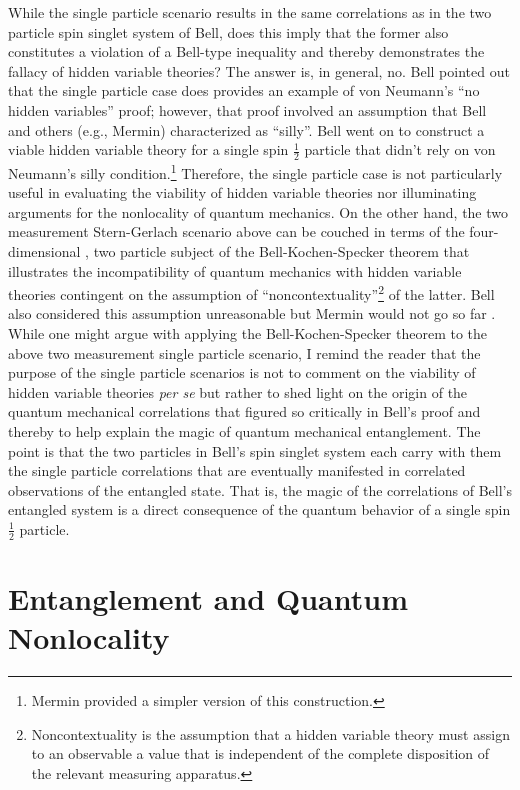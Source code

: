 \documentclass[12pt]{article}
\begin{document}
While the single particle scenario results in the same correlations as in the two particle spin singlet system of Bell, does this imply that the former also constitutes a violation of a Bell-type inequality and thereby demonstrates the fallacy of hidden variable theories?  The answer is, in general, no.  Bell \cite{Bel66} pointed out that the single particle case does provides an example of von Neumann's ``no hidden variables'' proof; however, that proof involved an assumption that Bell and others (e.g., Mermin\cite{Mer93}) characterized as ``silly''.  Bell went on to construct a viable hidden variable theory for a single spin $\frac{1}{2}$ particle that didn't rely on von Neumann's silly condition.\footnote{ Mermin \cite{Mer93} provided a simpler version of this construction.}  Therefore, the single particle case is not particularly useful in evaluating the viability of hidden variable theories nor illuminating arguments for the nonlocality of quantum mechanics.  On the other hand, the two measurement Stern-Gerlach scenario above can be couched in terms of the four-dimensional , two particle subject of the Bell-Kochen-Specker theorem\cite{Mer93} that illustrates the incompatibility of quantum mechanics with hidden variable theories contingent on the assumption of ``noncontextuality''\footnote{Noncontextuality is the assumption that a hidden variable theory must assign to an observable a value that is independent of the complete disposition of the relevant measuring apparatus.} of the latter.  Bell\cite{Bel66} also considered this assumption unreasonable but Mermin would not go so far \cite{Mer93}.  While one might argue with applying the Bell-Kochen-Specker theorem to the above two measurement single particle scenario, I remind the reader that the purpose of the single particle scenarios is not to comment on the viability of hidden variable theories {\it per se} but rather to shed light on the origin of the quantum mechanical correlations that figured so critically in Bell's  proof and thereby to help explain the magic of quantum mechanical entanglement.  The point is that the two particles in Bell's spin singlet system each carry with them the single particle correlations that are eventually manifested in correlated observations of the entangled state. That is, the magic of 
the correlations of Bell's entangled system is a direct consequence of the quantum behavior of a single spin $\frac{1}{2}$ particle.

\section{Entanglement and Quantum Nonlocality}\label{EQN}
\end{document}
